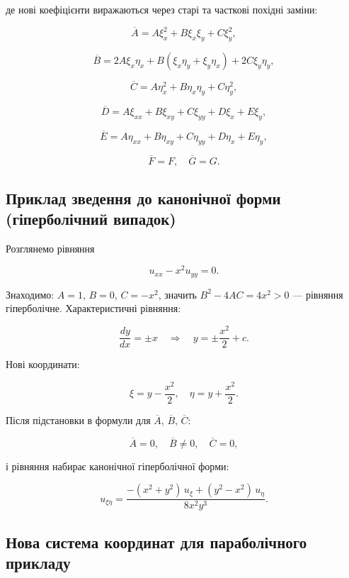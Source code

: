 \documentclass[
  ukrainian,
]{article}
\begin{document}
де нові коефіцієнти виражаються через старі та часткові похідні заміни:

\[\overline{A} = A\xi_x^2 + B\xi_x\xi_y + C\xi_y^2,\]

\[\overline{B} = 2A\xi_x\eta_x + B(\xi_x\eta_y + \xi_y\eta_x) + 2C\xi_y\eta_y,\]

\[\overline{C} = A\eta_x^2 + B\eta_x\eta_y + C\eta_y^2,\]

\[\overline{D} = A\xi_{xx} + B\xi_{xy} + C\xi_{yy} + D\xi_x + E\xi_y,\]

\[\overline{E} = A\eta_{xx} + B\eta_{xy} + C\eta_{yy} + D\eta_x + E\eta_y,\]

\[\overline{F} = F, \quad \overline{G} = G.\]

\subsection{Приклад зведення до канонічної форми (гіперболічний
випадок)}\label{ux43fux440ux438ux43aux43bux430ux434-ux437ux432ux435ux434ux435ux43dux43dux44f-ux434ux43e-ux43aux430ux43dux43eux43dux456ux447ux43dux43eux457-ux444ux43eux440ux43cux438-ux433ux456ux43fux435ux440ux431ux43eux43bux456ux447ux43dux438ux439-ux432ux438ux43fux430ux434ux43eux43a}

Розглянемо рівняння

\[u_{xx} - x^2 u_{yy} = 0.\]

Знаходимо: \(A = 1\), \(B = 0\), \(C = -x^2\), значить
\(B^2 - 4AC = 4x^2 > 0\) --- рівняння гіперболічне. Характеристичні
рівняння:

\[\frac{dy}{dx} = \pm x \quad \Rightarrow \quad y = \pm \frac{x^2}{2} + c.\]

Нові координати:

\[\xi = y - \frac{x^2}{2}, \quad \eta = y + \frac{x^2}{2}.\]

Після підстановки в формули для \(\overline{A}\), \(\overline{B}\),
\(\overline{C}\):

\[\overline{A} = 0, \quad \overline{B} \neq 0, \quad \overline{C} = 0,\]

і рівняння набирає канонічної гіперболічної форми:

\[u_{\xi\eta} = \frac{-(x^2+y^2)\,u_\xi + (y^2-x^2)\,u_\eta}{8x^2 y^3}.\]

\subsection{Нова система координат для параболічного
прикладу}\label{ux43dux43eux432ux430-ux441ux438ux441ux442ux435ux43cux430-ux43aux43eux43eux440ux434ux438ux43dux430ux442-ux434ux43bux44f-ux43fux430ux440ux430ux431ux43eux43bux456ux447ux43dux43eux433ux43e-ux43fux440ux438ux43aux43bux430ux434ux443}
\end{document}
